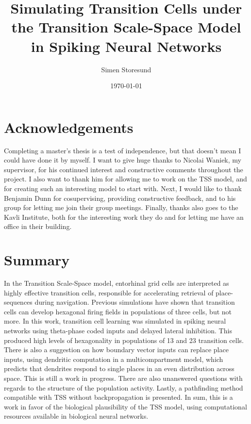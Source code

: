 \documentclass{article}
\title{Simulating Transition Cells under the Transition Scale-Space Model in Spiking Neural Networks}
\author{Simen Storesund}
\date{\today}
\begin{document}
    \maketitle

    \newpage
    \section*{Acknowledgements}
    Completing a master's thesis is a test of independence, but that doesn't mean I could have done it by myself. I want to give huge thanks to Nicolai Waniek, my supervisor, for his continued interest and constructive comments throughout the project. I also want to thank him for allowing me to work on the TSS model, and for creating such an interesting model to start with. Next, I would like to thank Benjamin Dunn for cosupervising, providing constructive feedback, and to his group for letting me join their group meetings. Finally, thanks also goes to the Kavli Institute, both for the interesting work they do and for letting me have an office in their building.

    \newpage
    \tableofcontents

    \newpage
    \section*{Summary}
    In the Transition Scale-Space model, entorhinal grid cells are interpreted as highly effective transition cells, responsible for accelerating retrieval of place-sequences during navigation. Previous simulations have shown that transition cells can develop hexagonal firing fields in populations of three cells, but not more. In this work, transition cell learning was simulated in spiking neural networks using theta-phase coded inputs and delayed lateral inhibition. This produced high levels of hexagonality in populations of 13 and 23 transition cells. There is also a suggestion on how boundary vector inputs can replace place inputs, using dendritic computation in a multicompartment model, which predicts that dendrites respond to single places in an even distribution across space. This is still a work in progress. There are also unanswered questions with regards to the structure of the population activity. Lastly, a pathfinding method compatible with TSS without backpropagation is presented. In sum, this is a work in favor of the biological plausibility of the TSS model, using computational resources available in biological neural networks.
\end{document}
